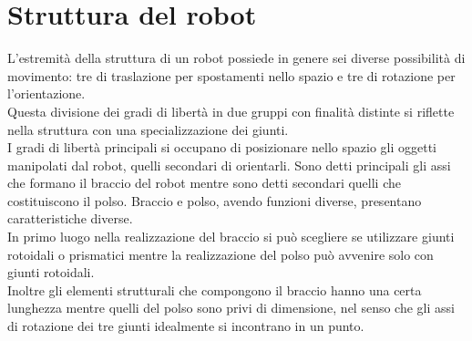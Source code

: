 \documentclass[%
corpo=11pt,
twoside,
 stile=classica,
oldstyle,
greek,%
]{toptesi}
\begin{document}
\section{Struttura del robot}
L'estremità della struttura di un robot possiede in genere sei diverse possibilità di movimento: tre di traslazione per spostamenti nello spazio e tre di rotazione per l'orientazione.\\
 Questa divisione dei gradi di libertà in due gruppi con finalità distinte si riflette nella struttura con una specializzazione dei giunti. \\
 I gradi di libertà principali si occupano di posizionare nello spazio gli oggetti manipolati dal robot, quelli secondari di orientarli. Sono detti principali gli assi che formano il braccio del robot mentre sono detti secondari quelli che costituiscono il polso. Braccio e polso, avendo funzioni diverse, presentano caratteristiche diverse. \\
 In primo luogo nella realizzazione del braccio si può scegliere se utilizzare giunti rotoidali o prismatici mentre la realizzazione del polso può avvenire solo con giunti rotoidali. \\
 Inoltre gli elementi strutturali che compongono il braccio hanno una certa lunghezza mentre quelli del polso sono privi di dimensione, nel senso che gli assi di rotazione dei tre giunti idealmente si incontrano in un punto. 
\end{document}
